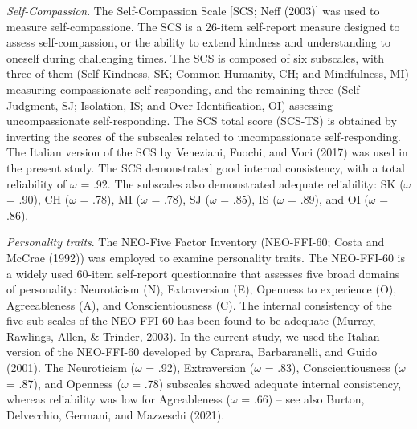 \documentclass[
  man]{apa6}
\begin{document}
\emph{Self-Compassion}. The Self-Compassion Scale {[}SCS; Neff (2003){]} was used to measure self-compassione. The SCS is a 26-item self-report measure designed to assess self-compassion, or the ability to extend kindness and understanding to oneself during challenging times. The SCS is composed of six subscales, with three of them (Self-Kindness, SK; Common-Humanity, CH; and Mindfulness, MI) measuring compassionate self-responding, and the remaining three (Self-Judgment, SJ; Isolation, IS; and Over-Identification, OI) assessing uncompassionate self-responding. The SCS total score (SCS-TS) is obtained by inverting the scores of the subscales related to uncompassionate self-responding. The Italian version of the SCS by Veneziani, Fuochi, and Voci (2017) was used in the present study. The SCS demonstrated good internal consistency, with a total reliability of \(\omega\) = .92. The subscales also demonstrated adequate reliability: SK (\(\omega\) = .90), CH (\(\omega\) = .78), MI (\(\omega\) = .78), SJ (\(\omega\) = .85), IS (\(\omega\) = .89), and OI (\(\omega\) = .86).

\emph{Personality traits}. The NEO-Five Factor Inventory (NEO-FFI-60; Costa and McCrae (1992)) was employed to examine personality traits. The NEO-FFI-60 is a widely used 60-item self-report questionnaire that assesses five broad domains of personality: Neuroticism (N), Extraversion (E), Openness to experience (O), Agreeableness (A), and Conscientiousness (C). The internal consistency of the five sub-scales of the NEO-FFI-60 has been found to be adequate (Murray, Rawlings, Allen, \& Trinder, 2003). In the current study, we used the Italian version of the NEO-FFI-60 developed by Caprara, Barbaranelli, and Guido (2001). The Neuroticism (\(\omega\) = .92), Extraversion (\(\omega\) = .83), Conscientiousness (\(\omega\) = .87), and Openness (\(\omega\) = .78) subscales showed adequate internal consistency, whereas reliability was low for Agreableness (\(\omega\) = .66) -- see also Burton, Delvecchio, Germani, and Mazzeschi (2021).
\end{document}
